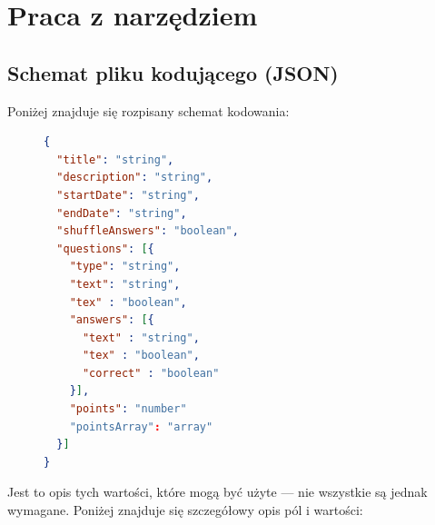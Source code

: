 \section{Praca z narzędziem}

\subsection{Schemat pliku kodującego (JSON)}
Poniżej znajduje się rozpisany schemat kodowania: 
\begin{figure}[H]
\begin{lstlisting}[language=json,firstnumber=1]
{
  "title": "string",
  "description": "string",
  "startDate": "string",
  "endDate": "string",
  "shuffleAnswers": "boolean",
  "questions": [{
    "type": "string", 
    "text": "string",
    "tex" : "boolean",
    "answers": [{
      "text" : "string",
      "tex" : "boolean",
      "correct" : "boolean"
    }],
    "points": "number"
    "pointsArray": "array"
  }]
}
\end{lstlisting}
\end{figure}
Jest to opis tych wartości, które mogą być użyte --- nie wszystkie są jednak 
wymagane. Poniżej znajduje się szczegółowy opis pól i wartości:
